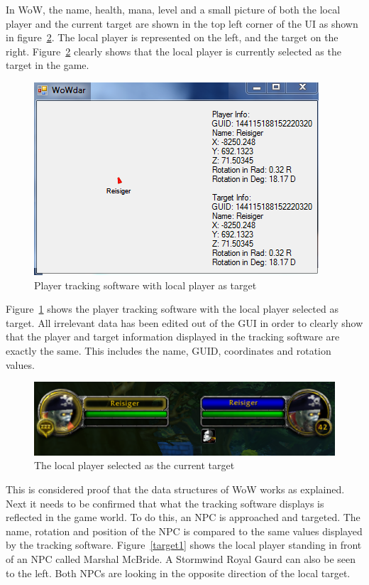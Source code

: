 In WoW, the name, health, mana, level and a small picture of both the local player and the current target are shown in the top left corner of the UI as shown in figure~\ref{self2}. The local player is represented on the left, and the target on the right. Figure~\ref{self2} clearly shows that the local player is currently selected as the target in the game.

\begin{figure}[htbp]
\centering
\includegraphics[scale = 0.75]{self1.png}	
\caption{Player tracking software with local player as target}
\label{self1}
\end{figure}

Figure~\ref{self1} shows the player tracking software with the local player selected as target. All irrelevant data has been edited out of the GUI in order to clearly show that the player and target information displayed in the tracking software are exactly the same. This includes the name, GUID, coordinates and rotation values.

\begin{figure}[htbp]
\centering
\includegraphics[scale = 0.75]{self2.png}	
\caption{The local player selected as the current target}
\label{self2}
\end{figure}

This is considered proof that the data structures of WoW works as explained. Next it needs to be confirmed that what the tracking software displays is reflected in the game world. To do this, an NPC is approached and targeted. The name, rotation and position of the NPC is compared to the same values displayed by the tracking software. Figure~\ref{target1} shows the local player standing in front of an NPC called Marshal McBride. A Stormwind Royal Gaurd can also be seen to the left. Both NPCs are looking in the opposite direction of the local target.

